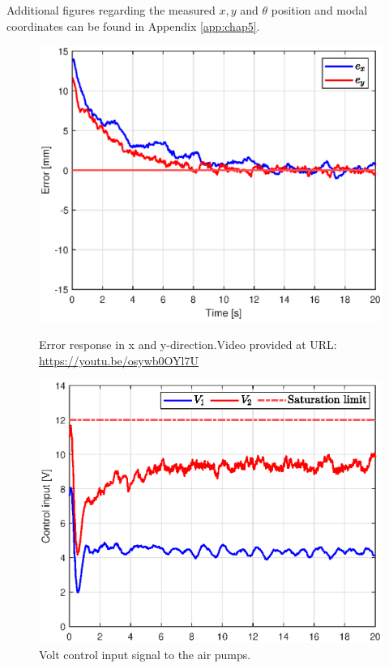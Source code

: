 Additional figures regarding the measured $x,y$ and $\theta$ position and modal coordinates can be found in Appendix \ref{app:chap5}.




\begin{figure}[H] 
    \begin{minipage}[b]{0.49\linewidth}
     \centering
    \includegraphics[width=\linewidth]{Figures/Chapter5/errorswingrightsquare.eps} 
    \caption{Error response in x and y-direction.Video provided at URL: \url{https://youtu.be/osywb0OYl7U}} 
    \label{fig5:errorswingright} 
       \end{minipage} 
    \begin{minipage}[b]{0.49\linewidth}
     \centering
    \includegraphics[width=\linewidth]{Figures/Chapter5/controlinputswingright.eps} 
    \caption{Volt control input signal to the air pumps.} 
    \label{fig5:inputswingright} 
    \end{minipage} 
\end{figure}



